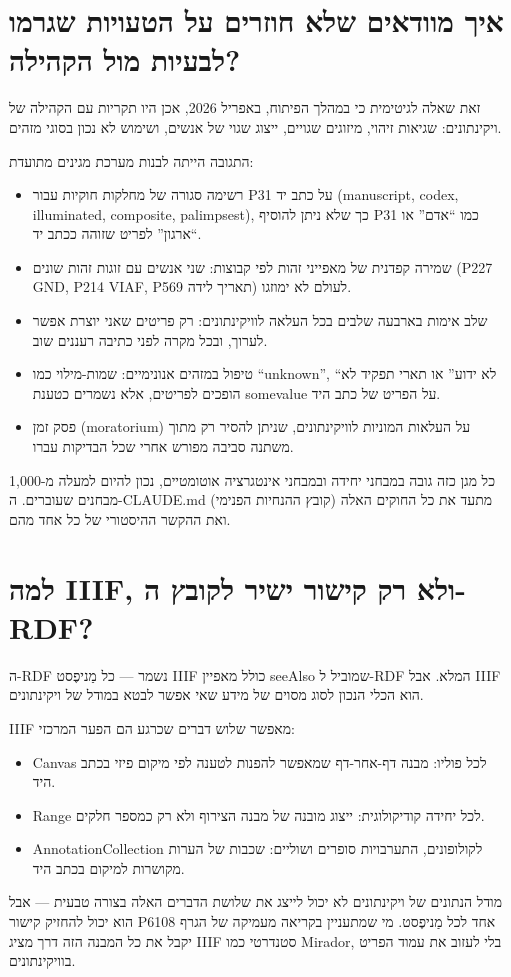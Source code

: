 \documentclass[12pt,a4paper]{article}
\begin{document}
\section{\texthebrew{איך מוודאים שלא חוזרים על הטעויות שגרמו לבעיות מול הקהילה?}}
\begin{hebrew}
זאת שאלה לגיטימית כי במהלך הפיתוח, באפריל 2026, אכן היו תקריות עם הקהילה של ויקינתונים: שגיאות זיהוי, מיזוגים שגויים, ייצוג שגוי של אנשים, ושימוש לא נכון בסוגי מזהים.
\par
התגובה הייתה לבנות מערכת מגינים מתועדת:
\begin{itemize}
  \item רשימה סגורה של מחלקות חוקיות עבור P31 על כתב יד (manuscript, codex, illuminated, composite, palimpsest), כך שלא ניתן להוסיף P31 כמו ``אדם'' או ``ארגון'' לפריט שזוהה ככתב יד.
  \item שמירה קפדנית של מאפייני זהות לפי קבוצות: שני אנשים עם זוגות זהות שונים (P227 GND, P214 VIAF, P569 תאריך לידה) לעולם לא ימוזגו.
  \item שלב אימות בארבעה שלבים בכל העלאה לוויקינתונים: רק פריטים שאני יוצרת אפשר לערוך, ובכל מקרה לפני כתיבה רעננים שוב.
  \item טיפול במזהים אנונימיים: שמות-מילוי כמו ``unknown'', ``לא ידוע'' או תארי תפקיד לא הופכים לפריטים, אלא נשמרים כטענת somevalue על הפריט של כתב היד.
  \item פסק זמן (moratorium) על העלאות המוניות לוויקינתונים, שניתן להסיר רק מתוך משתנה סביבה מפורש אחרי שכל הבדיקות עברו.
\end{itemize}
\par
כל מגן כזה גובה במבחני יחידה ובמבחני אינטגרציה אוטומטיים, נכון להיום למעלה מ-1{,}000 מבחנים שעוברים. ה-CLAUDE.md (קובץ ההנחיות הפנימי) מתעד את כל החוקים האלה ואת ההקשר ההיסטורי של כל אחד מהם.
\end{hebrew}


\section{\texthebrew{למה IIIF, ולא רק קישור ישיר לקובץ ה-RDF?}}
\begin{hebrew}
ה-RDF נשמר --- כל מַניפֶסט IIIF כולל מאפיין seeAlso שמוביל ל-RDF המלא. אבל IIIF הוא הכלי הנכון לסוג מסוים של מידע שאי אפשר לבטא במודל של ויקינתונים.
\par
IIIF מאפשר שלוש דברים שכרגע הם הפער המרכזי:
\begin{itemize}
  \item Canvas לכל פוליו: מבנה דף-אחר-דף שמאפשר להפנות לטענה לפי מיקום פיזי בכתב היד.
  \item Range לכל יחידה קודיקולוגית: ייצוג מובנה של מבנה הצירוף ולא רק כמספר חלקים.
  \item AnnotationCollection לקולופונים, התערבויות סופרים ושוליים: שכבות של הערות מקושרות למיקום בכתב היד.
\end{itemize}
\par
מודל הנתונים של ויקינתונים לא יכול לייצג את שלושת הדברים האלה בצורה טבעית --- אבל הוא יכול להחזיק קישור P6108 אחד לכל מַניפֶסט. מי שמתעניין בקריאה מעמיקה של הגרף יקבל את כל המבנה הזה דרך מציג IIIF סטנדרטי כמו Mirador, בלי לעזוב את עמוד הפריט בוויקינתונים.
\end{hebrew}
\end{document}
